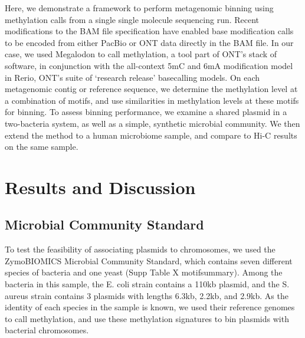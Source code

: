 Here, we demonstrate a framework to perform metagenomic binning using methylation calls from a single single molecule sequencing run. Recent modifications to the BAM file specification have enabled base modification calls to be encoded from either PacBio or ONT data directly in the BAM file.  In our case, we used Megalodon to call methylation, a tool part of ONT’s stack of software, in conjunction with the all-context 5mC and 6mA modification model in Rerio, ONT’s suite of ‘research release’ basecalling models. On each metagenomic contig or reference sequence, we determine the methylation level at a combination of motifs, and use similarities in methylation levels at these motifs for binning. To assess binning performance, we examine a shared plasmid in a two-bacteria system, as well as a simple, synthetic microbial community. We then extend the method to a human microbiome sample, and compare to Hi-C results on the same sample.


\section{Results and Discussion}
\label{sec:results}

\subsection{Microbial Community Standard}
\label{sec:zymo}

To test the feasibility of associating plasmids to chromosomes, we used the ZymoBIOMICS Microbial Community Standard, which contains seven different species of bacteria and one yeast (Supp Table X motifsummary). Among the bacteria in this sample, the E. coli strain contains a 110kb plasmid, and the S. aureus strain contains 3 plasmids with lengths 6.3kb, 2.2kb, and 2.9kb. As the identity of each species in the sample is known, we used their reference genomes to call methylation, and use these methylation signatures to bin plasmids with bacterial chromosomes.

